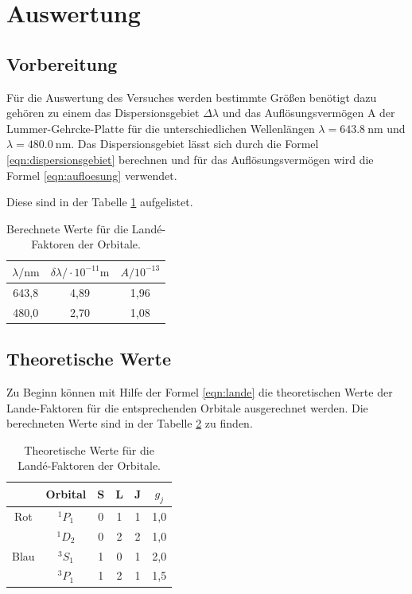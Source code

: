 \section{Auswertung}
\label{sec:Auswertung}
\subsection{Vorbereitung}
Für die Auswertung des Versuches
werden bestimmte Größen benötigt dazu gehören
zu einem das Dispersionsgebiet $\Delta\lambda$
und das Auflösungsvermögen A der Lummer-Gehrcke-Platte
für die unterschiedlichen Wellenlängen $\lambda=\SI{643.8}{\nano\meter}$
und $\lambda=\SI{480.0}{\nano\meter}$.
Das Dispersionsgebiet lässt sich durch die Formel \eqref{eqn:dispersionsgebiet} berechnen
und für das Auflösungsvermögen wird die Formel \eqref{eqn:aufloesung} verwendet.


Diese sind in der Tabelle  \ref{tab:vorbereitung} aufgelistet.
\begin{table}
  \centering
  \caption{Berechnete Werte für die Landé-Faktoren der Orbitale.}
  \label{tab:vorbereitung}
  \begin{tabular}{c c c}
    \toprule
       $\lambda / \si{\nano\meter} $ &  $\delta\lambda/ \cdot10^{-11}\si{\meter}$  & $A / 10^{-13}$\\
     \midrule
    643,8  &  4,89 &  1,96 \\
    480,0  &  2,70 &  1,08 \\
    \bottomrule
  \end{tabular}
\end{table}



\FloatBarrier

\subsection{Theoretische Werte}
Zu Beginn können mit Hilfe der Formel \eqref{eqn:lande}
die theoretischen Werte der Lande-Faktoren
für die entsprechenden Orbitale ausgerechnet werden.
Die berechneten Werte sind in der Tabelle \ref{tab:theo1}
zu finden.

\begin{table}
  \centering
  \caption{Theoretische Werte für die Landé-Faktoren der Orbitale.}
  \label{tab:theo1}
  \begin{tabular}{c c c c c c}
    \toprule
& Orbital  & S   &  L & J  & $g_j$ \\
    \midrule
Rot & $^1P_1$ & 0 & 1 & 1 & 1,0\\
&$^1D_2$& 0 & 2 & 2 & 1,0\\
Blau&$^3S_1$& 1 & 0 & 1 & 2,0\\
&$^3P_1$& 1 & 2 & 1 & 1,5\\
    \bottomrule
  \end{tabular}
\end{table}

